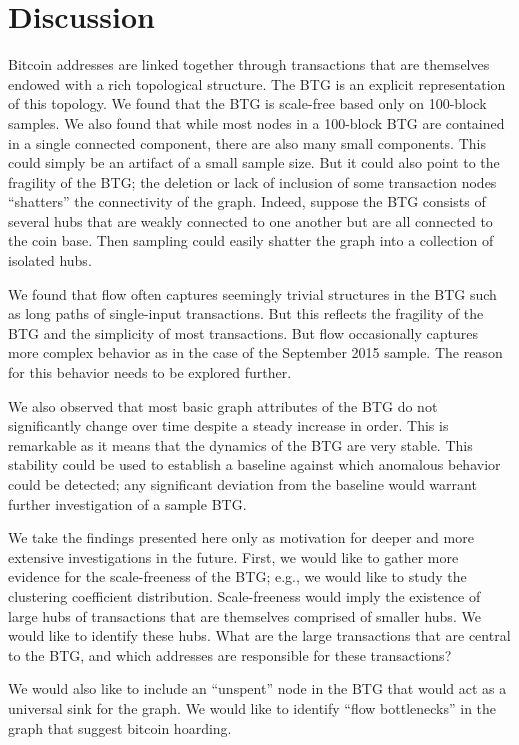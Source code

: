 \documentclass[letterpaper, 10 pt, conference]{ieeeconf}  %
\begin{document}
\section{Discussion}

Bitcoin addresses are linked together through transactions that are themselves endowed with a rich topological structure. The BTG is an explicit representation of this topology. We found that the BTG is scale-free based only on 100-block samples. We also found that while most nodes in a 100-block BTG are contained in a single connected component, there are also many small components. This could simply be an artifact of a small sample size. But it could also point to the fragility of the BTG; the deletion or lack of inclusion of some transaction nodes ``shatters'' the connectivity of the graph. Indeed, suppose the BTG consists of several hubs that are weakly connected to one another but are all connected to the coin base. Then sampling could easily shatter the graph into a collection of isolated hubs.

We found that flow often  captures seemingly trivial structures in the BTG such as long paths of single-input transactions. But this reflects the fragility of the BTG and the simplicity of most transactions. But flow occasionally captures more complex behavior as in the case of the September 2015 sample. The reason for this behavior needs to be explored further.

We also observed that most basic graph attributes of the BTG do not significantly change over time despite a steady increase in order. This is remarkable as it means that the dynamics of the BTG are very stable. This stability could be used to establish a baseline against which anomalous behavior could be detected; any significant deviation from the baseline would warrant further investigation of a sample BTG.

We take the findings presented here only as motivation for deeper and more extensive investigations in the future. First, we would like to gather more evidence for the scale-freeness of the BTG; e.g., we would like to study the clustering coefficient distribution. Scale-freeness would imply the existence of large hubs of transactions that are themselves comprised of smaller hubs. We would like to identify these hubs. What are the large transactions that are central to the BTG, and which addresses are responsible for these transactions?

We would also like to include an ``unspent'' node in the BTG that would act as a universal sink for the graph. We would like to identify ``flow bottlenecks'' in the graph that suggest bitcoin hoarding.
\end{document}
